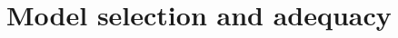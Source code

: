 \documentclass[12pt,letterpaper]{article}
\begin{document}
\section{Model selection and adequacy}

%
%
%
\end{document}
